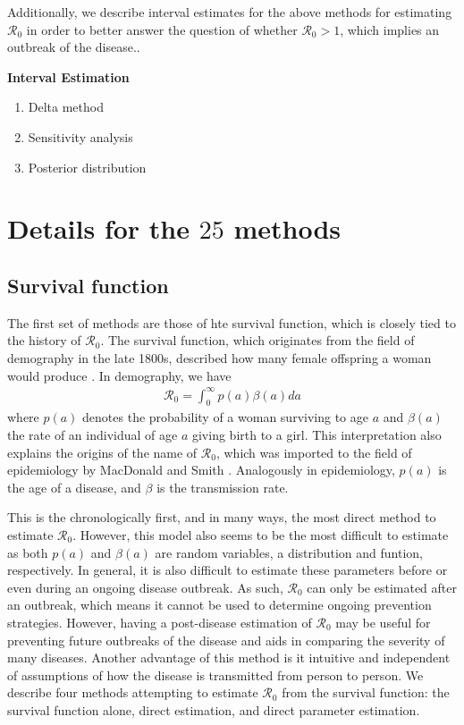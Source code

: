 \documentclass[12pt]{article}
\newcommand{\XX}{\ensuremath{25}} %
\newcommand{\rr}{\ensuremath{\mathcal{R}_0}}
\begin{document}
  Additionally, we describe  interval estimates for the above methods for estimating $\rr$ in order to better answer the question of whether $\rr > 1$, which implies an outbreak of the disease..  
  
\textbf{Interval Estimation}
\begin{enumerate}
\item Delta method
\item Sensitivity analysis
  \item Posterior distribution
  \end{enumerate}






\section{Details for the $\XX$ methods}
\label{sec:details}
\subsection{Survival function}
\label{sec:direct}

The first set of methods are those of hte survival function, which is closely  tied to the history of $\rr$.  The survival function, which originates from the field of demography in the late 1800s, described how many female offspring a woman would produce \citep{dietz1993estimation}.  In demography, we have
\begin{align*}
\rr = \int_0^\infty p(a) \beta(a) da
\end{align*}
where $p(a)$ denotes the probability of a woman surviving to age $a$ and $\beta(a)$ the rate of an individual of age $a$ giving birth to a  girl.   This interpretation also explains the origins of the name of $\rr$, which was imported to the field of epidemiology by MacDonald and Smith \citep{dietz1993estimation}.  Analogously in epidemiology, $p(a)$ is the age of a disease, and $\beta$ is the transmission rate.

This is the chronologically first, and in many ways, the most direct method to estimate $\rr$.  However, this model also seems to be the most difficult to estimate as both $p(a)$ and $\beta (a)$ are random variables, a distribution and funtion, respectively.  In general, it is also difficult to estimate these parameters before or even during an ongoing disease outbreak.  As such, $\rr$ can only be estimated after an outbreak, which means it cannot be used to determine ongoing prevention strategies.  However, having a post-disease estimation of $\rr$ may be useful for preventing future outbreaks of the disease and aids in comparing the severity of many diseases.  Another advantage of this method is it intuitive and independent of assumptions of how the disease is transmitted from person to person.    We describe four methods attempting to estimate $\rr$ from the survival function:  the survival function alone, direct estimation, and direct parameter estimation.
\end{document}
